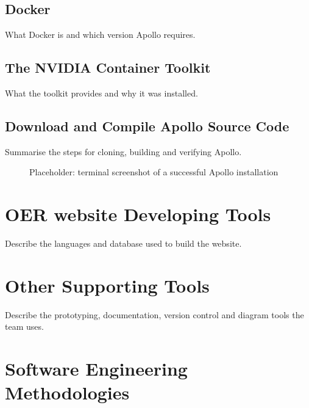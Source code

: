 \documentclass[
  12pt,
  a4paper,
]{report}
\begin{document}
\subsection{Docker}\label{docker}

What Docker is and which version Apollo requires.

\subsection{The NVIDIA Container
Toolkit}\label{the-nvidia-container-toolkit}

What the toolkit provides and why it was installed.

\subsection{Download and Compile Apollo Source
Code}\label{download-and-compile-apollo-source-code}

Summarise the steps for cloning, building and verifying Apollo.

\begin{figure}
\centering
{}
\caption{Placeholder: terminal screenshot of a successful Apollo
installation}
\end{figure}

\section{OER website Developing
Tools}\label{oer-website-developing-tools}

Describe the languages and database used to build the website.

\section{Other Supporting Tools}\label{other-supporting-tools}

Describe the prototyping, documentation, version control and diagram
tools the team uses.

\section{Software Engineering
Methodologies}\label{software-engineering-methodologies}
\end{document}
